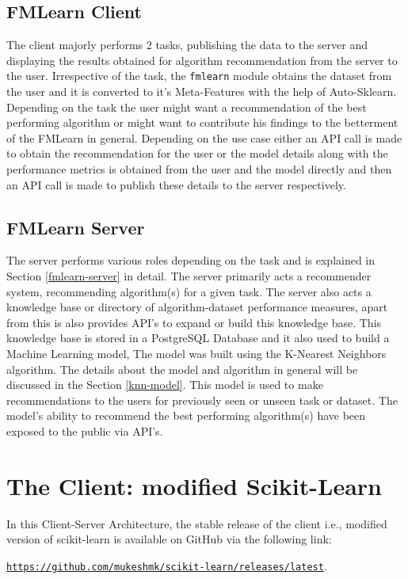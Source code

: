 \subsection*{FMLearn Client}

The client majorly performs 2 tasks, publishing the data to the server and displaying the results obtained for algorithm recommendation from the server to the user. Irrespective of the task, the \texttt{fmlearn} module obtains the dataset from the user and it is converted to it's Meta-Features with the help of Auto-Sklearn. Depending on the task the user might want a recommendation of the best performing algorithm or might want to contribute his findings to the betterment of the FMLearn in general. Depending on the use case either an API call is made to obtain the recommendation for the user or the model details along with the performance metrics is obtained from the user and the model directly and then an API call is made to publish these details to the server respectively.

\subsection*{FMLearn Server}

The server performs various roles depending on the task and is explained in Section \ref{fmlearn-server} in detail. The server primarily acts a recommender system, recommending algorithm(s) for a given task. The server also acts a knowledge base or directory of algorithm-dataset performance measures, apart from this is also provides API's to expand or build this knowledge base. This knowledge base is stored in a PostgreSQL Database and it also used to build a Machine Learning model, The model was built using the K-Nearest Neighbors algorithm. The details about the model and algorithm in general will be discussed in the Section \ref{knn-model}. This model is used to make recommendations to the users for previously seen or unseen task or dataset. The model's ability to recommend the best performing algorithm(s) have been exposed to the public via API's.


\section{The Client: modified Scikit-Learn}
\label{scikit-learn}

In this Client-Server Architecture, the stable release of the client i.e., modified version of scikit-learn is available on GitHub via the following link:
\begin{center}
\href{https://github.com/mukeshmk/scikit-learn/releases/latest}
{\texttt{https://github.com/mukeshmk/scikit-learn/releases/latest}}.
\end{center}

